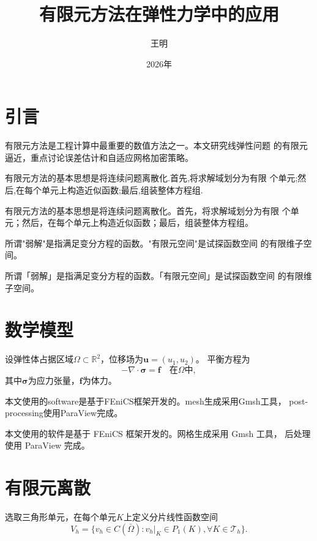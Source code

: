 \documentclass{article}
\title{有限元方法在弹性力学中的应用}
\author{王明}
\date{2026年}
\begin{document}
\maketitle

\section{引言}

有限元方法是工程计算中最重要的数值方法之一。本文研究线弹性问题
的有限元逼近，重点讨论误差估计和自适应网格加密策略。

有限元方法的基本思想是将连续问题离散化.首先,将求解域划分为有限
个单元;然后,在每个单元上构造近似函数;最后,组装整体方程组.

有限元方法的基本思想是将连续问题离散化。首先，将求解域划分为有限
个单元；然后，在每个单元上构造近似函数；最后，组装整体方程组。

所谓"弱解"是指满足变分方程的函数。"有限元空间"是试探函数空间
的有限维子空间。

所谓「弱解」是指满足变分方程的函数。「有限元空间」是试探函数空间
的有限维子空间。

\section{数学模型}

设弹性体占据区域$\Omega \subset \mathbb{R}^2$，位移场为$\mathbf{u} = (u_1, u_2)$。
平衡方程为
\[
  -\nabla \cdot \boldsymbol{\sigma} = \mathbf{f} \quad \text{在}\Omega\text{中},
\]
其中$\boldsymbol{\sigma}$为应力张量，$\mathbf{f}$为体力。

本文使用的software是基于FEniCS框架开发的。mesh生成采用Gmsh工具，
post-processing使用ParaView完成。

本文使用的软件是基于 FEniCS 框架开发的。网格生成采用 Gmsh 工具，
后处理使用 ParaView 完成。

\section{有限元离散}

选取三角形单元，在每个单元$K$上定义分片线性函数空间
\[
  V_h = \{v_h \in C(\bar{\Omega}) : v_h|_K \in P_1(K), \forall K \in \mathcal{T}_h\}.
\]
\end{document}
